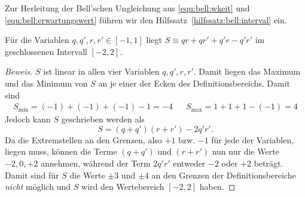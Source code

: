 \begin{refsection}
Zur Herleitung der Bell'schen Ungleichung aus \eqref{equ:bell:wkeit} und
\eqref{equ:bell:erwartungswert} f\"uhren wir den
Hilfssatz~\ref{hilfssatz:bell:interval} ein.

\begin{hilfssatz}
    F\"ur die Variablen $q, q', r, r' \in [-1,1]$ liegt 
    $S \equiv qr + qr' + q'r - q'r'$ im geschlossenen Intervall $[-2,2]$.
    \label{hilfssatz:bell:interval}
\end{hilfssatz}
\begin{proof}[Beweis]
    $S$ ist linear in allen vier Variablen $q, q', r, r'$.
    Damit liegen das Maximum und das Minimum von $S$ an je einer der Ecken des
    Definitionsbereichs. Damit sind
    \begin{align*}
        S_{\text{min}} = (-1) + (-1) + (-1) - 1 = -4 &&
        S_ {\text{max}} = 1 + 1 + 1 - (-1) = 4
    \end{align*}
    Jedoch kann $S$ geschrieben werden als
    \[
        S = (q + q')(r + r') - 2 q'r'.
    \]
    Da die Extremstellen an den Grenzen, also $+1$ bzw. $-1$ f\"ur jede der
    Variablen, liegen muss, k\"onnen die Terme $(q+q')$ und $(r+r')$ nun nur
    die Werte $-2, 0, +2$ annehmen, w\"ahrend der Term $2q'r'$ 
    entweder $-2$ oder $+2$ betr\"agt.
    Damit sind f\"ur $S$ die Werte $\pm 3$ und $\pm 4$ an den Grenzen der
    Definitionsbereiche \emph{nicht} m\"oglich und $S$ wird den Wertebereich
    $[-2,2]$ haben.
\end{proof}


\end{refsection}
